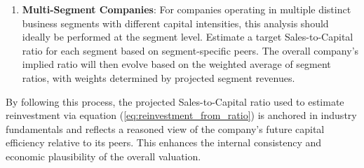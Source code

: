 \begin{enumerate}
\begin{itemize}
              \item \textit{Sustained Difference}: If the company possesses clear, sustainable competitive advantages (or disadvantages) in capital efficiency, its ratio might be projected to remain above (or below) the average.
              \item \textit{Specific Initiatives}: If management is undertaking specific actions expected to improve (or worsen) capital efficiency, this should be factored into the projection.
          \end{itemize}
          The projection defines the expected Sales-to-Capital ratio for the remainder of the forecast period (\(n=2 \text{ or } 3\) through \(N\)).
    \item \textbf{Multi-Segment Companies}: For companies operating in multiple distinct business segments with different capital intensities, this analysis should ideally be performed at the segment level. Estimate a target Sales-to-Capital ratio for each segment based on segment-specific peers. The overall company's implied ratio will then evolve based on the weighted average of segment ratios, with weights determined by projected segment revenues.
\end{enumerate}

By following this process, the projected Sales-to-Capital ratio used to estimate reinvestment via equation (\ref{eq:reinvestment_from_ratio}) is anchored in industry fundamentals and reflects a reasoned view of the company's future capital efficiency relative to its peers. This enhances the internal consistency and economic plausibility of the overall valuation.
